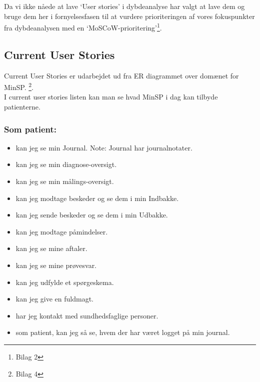 %
%
%
%
%
%
%
%
%
%
%
%
%
%
%
%
%
%
%
%
%
%
%
%
%
%
Da vi ikke nåede at lave ‘User stories’ i dybdeanalyse har valgt at lave dem og bruge dem her i fornyelsesfasen til at vurdere prioriteringen af vores fokuspunkter fra dybdeanalysen med en  ‘MoSCoW-prioritering’\footnote{Bilag 2}. 
\subsection{Current User Stories} %
Current User Stories er udarbejdet ud fra ER diagrammet over domænet for MinSP. \footnote{Bilag 4}.\\ 
I current user stories listen kan man se hvad MinSP i dag kan tilbyde patienterne.
\subsubsection*{Som patient:}
\begin{itemize}
\item kan jeg se min Journal. Note: Journal har journalnotater. 
\item kan jeg se min diagnose-oversigt.
\item kan jeg se min målings-oversigt.
\item kan jeg modtage beskeder og se dem i min Indbakke.
\item kan jeg sende beskeder og se dem i min Udbakke.
\item kan jeg modtage påmindelser.
\item kan jeg se mine aftaler. 
\item kan jeg se mine prøvesvar.
\item kan jeg udfylde et spørgeskema.
\item kan jeg give en fuldmagt. 
\item har jeg kontakt med sundhedsfaglige personer. 
\item som patient, kan jeg så se, hvem der har været logget på min journal.
\end{itemize}

